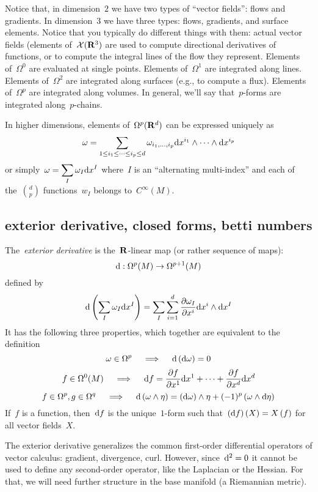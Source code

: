 Notice that, in dimension~$2$ we have two types of ``vector fields'': flows
and gradients.  In dimension~$3$ we have three types: flows, gradients, and
surface elements.  Notice that you typically do different things with them:
actual vector fields (elements of~$\mathcal{X}(\mathbf{R}^3)$ are used to compute
directional derivatives of functions, or to compute the integral lines of the
flow they represent.  Elements of~$\Omega^0$ are evaluated at single points.
Elements of~$\Omega^1$ are integrated along lines.  Elements of~$\Omega^2$
are integrated along surfaces (e.g., to compute a flux).  Elements
of~$\Omega^p$ are integrated along volumes.  In general, we'll say
that~$p$-forms are integrated along~$p$-chains.

In higher dimensions, elements of~$\Omega^p(\mathbf{R}^d)$ can be expressed uniquely
as
\[
	\omega  =
	\sum_{1\le i_1\le\cdots\le i_p\le d}
	\omega_{i_1,\ldots,i_p} \mathrm{d} x^{i_1}\wedge\cdots\wedge\mathrm{d} x^{i_p}
\]
or simply~$\displaystyle\omega=\sum_I\omega_I\mathrm{d} x^I$
where~$I$ is an ``alternating multi-index'' and each of the~${d\choose p}$
functions~$w_I$ belongs to~$C^\infty(M)$.

\subsection{exterior derivative, closed forms, betti numbers}

The~\emph{exterior derivative} is the~$\mathbf{R}$-linear map (or rather sequence of maps):
\[
	\mathrm{d} :\Omega^p(M) \to \Omega^{p+1}(M)
\]
defined by
\[
	\mathrm{d}\left( \sum_I\omega_I\mathrm{d} x^I \right)
=\sum_I \sum_{i=1}^d\frac{\partial\omega_I}{\partial x^i}\mathrm{d} x^i
	\wedge\mathrm{d} x^I
\]
It has the following three properties, which together are equivalent to the
definition
\[
	\omega\in\Omega^p
	\quad\implies\quad
	\mathrm{d}\left(\mathrm{d}\omega\right)=0
\]
\[
	f\in\Omega^0(M)
	\quad\implies\quad
	\mathrm{d} f =
	\frac{\partial f}{\partial x^1}\mathrm{d} x^1
	+\cdots+
	\frac{\partial f}{\partial x^d}\mathrm{d} x^d
\]
\[
	f\in\Omega^p,g\in\Omega^q
	\quad\implies\quad
	\mathrm{d}\left(\omega\wedge\eta\right)
	=
	\left(\mathrm{d}\omega\right)\wedge\eta
	+
	(-1)^p
	\left(
		\omega\wedge\mathrm{d}\eta
	\right)
\]
If~$f$ is a function, then~$\mathrm{d} f$ is the unique~$1$-form such
that~$\left(\mathrm{d} f\right)(X)=X\left(f\right)$ for all vector fields~$X$.

The exterior derivative generalizes the common first-order differential
operators of vector calculus: gradient, divergence, curl.  However,
since~$\mathrm{d}^2=0$ it cannot be used to define any second-order operator, like
the Laplacian or the Hessian.  For that, we will need further structure in
the base manifold (a Riemannian metric).

